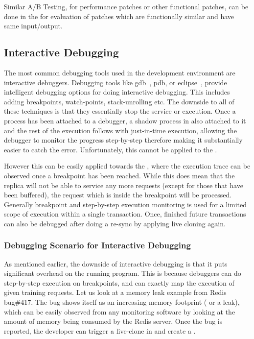 Similar A/B Testing, for performance patches or other functional patches, can be done in the \debugcontainer for evaluation of patches which are functionally similar and have same input/output.


\subsection{Interactive Debugging}

The most common debugging tools used in the development environment are interactive debuggers. 
Debugging tools like gdb~\cite{gdb}, pdb, or eclipse~\cite{eclipse}, provide intelligent debugging options for doing interactive debugging. 
This includes adding breakpoints, watch-points, stack-unrolling etc.
The downside to all of these techniques is that they essentially stop the service or execution.
Once a process has been attached to a debugger, a shadow process in also attached to it and the rest of the execution follows with just-in-time execution, allowing the debugger to monitor the progress step-by-step therefore making it substantially easier to catch the error.
Unfortunately, this cannot be applied to the \productioncontainer.

However this can be easily applied towards the \debugcontainer, where the execution trace can be observed once a breakpoint has been reached.
While this does mean that the replica will not be able to service any more requests (except for those that have been buffered), the request which is inside the breakpoint will be processed.
Generally breakpoint and step-by-step execution monitoring is used for a limited scope of execution within a single transaction.
Once, finished future transactions can also be debugged after doing a re-sync by applying live cloning again.

\subsubsection{Debugging Scenario for Interactive Debugging}

As mentioned earlier, the downside of interactive debugging is that it puts significant overhead on the running program.
This is because debuggers can do step-by-step execution on breakpoints, and can exactly map the execution of given training requests.
Let us look at a memory leak example from Redis bug\#417. 
The bug shows itself as an increasing memory footprint ( or a leak), which can be easily observed from any monitoring software by looking at the amount of memory being consumed by the Redis server.
Once the bug is reported, the developer can trigger a live-clone in \parikshan and create a \debugcontainer.

